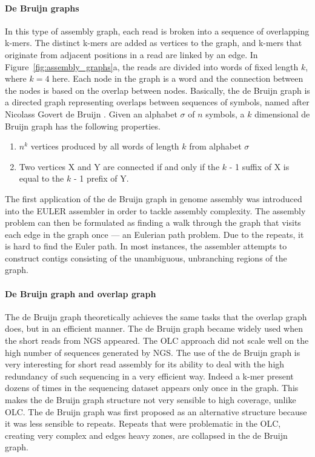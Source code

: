 \paragraph{De Bruijn graphs}
In this type of assembly graph, each read is broken into a sequence of overlapping k-mers. The distinct
k-mers are added as vertices to the graph, and k-mers that originate from adjacent positions in
a read are linked by an edge.
In Figure~\ref{fig:assembly_graphs}a, the reads are divided into words of fixed length $k$, where $k=4$ here.
Each node in the graph is a word and the connection between the nodes is based on the overlap between nodes.
Basically, the de Bruijn graph is a directed graph representing overlaps
between sequences of symbols, named after Nicolass Govert de Bruijn \citep{todd1933combinatorial}. Given an
alphabet $\sigma$ of $n$ symbols, a $k$ dimensional de Bruijn graph has the following properties.
\begin{enumerate}
 \item $n^k$ vertices produced by all words of length $k$ from alphabet $\sigma$
 \item Two vertices X and Y are connected if and only if the $k$ - 1
suffix of X is equal to the $k$ - 1 prefix of Y.
\end{enumerate}

The first application of the de Bruijn graph in genome assembly was introduced into
the EULER assembler \citep{pevzner2001eulerian} in order to tackle assembly complexity. 
The assembly problem can then be formulated as finding a walk
through the graph that visits each edge in the graph once --- an Eulerian path problem.
Due to the repeats, it is hard to find the Euler path. 
In most instances, the assembler attempts to construct
contigs consisting of the unambiguous, unbranching regions of the graph.

\paragraph{De Bruijn graph and overlap graph}
The de Bruijn graph theoretically achieves
the same tasks that the overlap graph does, but in an efficient manner.
The de Bruijn graph became widely used when the short reads from NGS appeared. The OLC
approach did not scale well on the high number of sequences generated by NGS. The
use of the de Bruijn graph is very interesting for short read assembly for its ability to
deal with the high redundancy of such sequencing in a very efficient way. Indeed a k-mer
present dozens of times in the sequencing dataset appears only once in the graph. This
makes the de Bruijn graph structure not very sensible to high coverage, unlike
OLC. The de Bruijn graph was first proposed as an alternative structure \citep{pevzner2001eulerian} because it
was less sensible to repeats. Repeats that were problematic in the OLC, creating very
complex and edges heavy zones, are collapsed in the de Bruijn graph.

